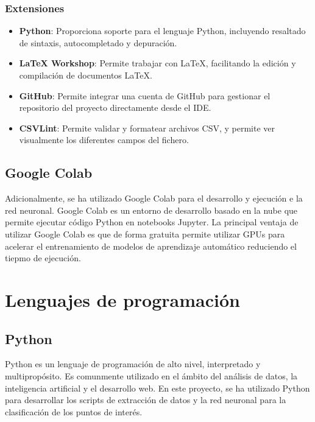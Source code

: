 \subsubsection{Extensiones}

\begin{itemize}
    
    \item \textbf{Python}: Proporciona soporte para el lenguaje Python, incluyendo resaltado de sintaxis, autocompletado y depuración.
    \item \textbf{LaTeX Workshop}: Permite trabajar con LaTeX, facilitando la edición y compilación de documentos LaTeX.
    \item \textbf{GitHub}: Permite integrar una cuenta de GitHub para gestionar el repositorio del proyecto directamente desde el IDE.
    \item \textbf{CSVLint}: Permite validar y formatear archivos CSV, y permite ver visualmente los diferentes campos del fichero.

\end{itemize}

\subsection{Google Colab}
Adicionalmente, se ha utilizado Google Colab para el desarrollo y ejecución e la red neuronal.
Google Colab es un entorno de desarrollo basado en la nube que permite ejecutar código Python en notebooks Jupyter.
La principal ventaja de utilizar Google Colab es que de forma gratuita permite utilizar GPUs para acelerar el entrenamiento de modelos de aprendizaje automático reduciendo el tiepmo de ejecución.

\section {Lenguajes de programación}

\subsection{Python}

Python es un lenguaje de programación de alto nivel, interpretado y multipropósito.
Es comunmente utilizado en el ámbito del análisis de datos, la inteligencia artificial y el desarrollo web.
En este proyecto, se ha utilizado Python para desarrollar los scripts de extracción de datos y la red neuronal para la clasificación de los puntos de interés.

